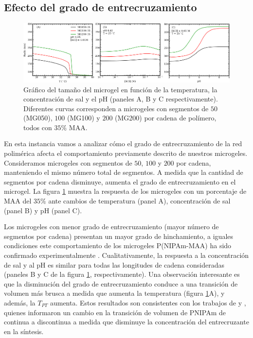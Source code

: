 \subsection{Efecto del grado de entrecruzamiento} \label{sec:gel:entrecruzamiento}


\begin{figure}[!tb]
	\centering
	\includegraphics[width=0.99\linewidth]{Figures/graph-gel/R-all_xlink.pdf}
	\caption{Gr\'afico del tama\~no del microgel en funci\'on de la temperatura, la concentraci\'on de sal y el pH (paneles A, B y C respectivamente).
		Diferentes curvas corresponden a microgeles con segmentos de $50$ (MG050), $100$ (MG100) y $200$ (MG200) por cadena de pol\'imero, todos con $35\%$ MAA.}
	\label{fig:gel:R_xlink}
\end{figure}

En esta instancia vamos a analizar c\'omo el grado de entrecruzamiento de la red polim\'erica afecta el comportamiento previamente descrito de nuestros microgeles. Consideramos microgeles con segmentos de $50$, $100$ y $200$ por cadena, manteniendo el mismo n\'umero total de segmentos. A medida que la cantidad de segmentos por cadena disminuye, aumenta el grado de entrecruzamiento en el microgel. La figura \ref{fig:gel:R_xlink} muestra la respuesta de los microgeles con un porcentaje de MAA del $35\%$ ante cambios de temperatura (panel A), concentraci\'on de sal (panel B) y pH (panel C).

Los microgeles con menor grado de entrecruzamiento (mayor n\'umero de segmentos por cadena) presentan un mayor grado de hinchamiento, a iguales condiciones este comportamiento de los microgeles P(NIPAm-MAA) ha sido confirmado experimentalmente \cite{khan2013preparation}. Cualitativamente, la respuesta a la concentraci\'on de sal y al pH es similar para todas las longitudes de cadena consideradas (paneles B y C de la figura \ref{fig:gel:R_xlink}, respectivamente). Una observaci\'on interesante es que la disminuci\'on del grado de entrecruzamiento conduce a una transici\'on de volumen m\'as brusca a medida que aumenta la temperatura (figura \ref{fig:gel:R_xlink}A), y adem\'as, la $T_{PT}$ aumenta. Estos resultados son consistentes con los trabajos de \citet{li1989study} y \citet{wu1997volume}, quienes informaron un cambio en la transici\'on de volumen de PNIPAm de continua a discontinua a medida que disminuye la concentraci\'on del entrecruzante en la s\'intesis.

